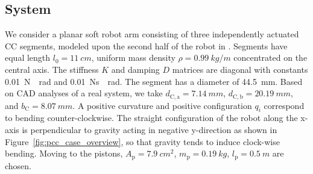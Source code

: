\subsection{System}
%
We consider a planar soft robot arm consisting of three independently actuated CC segments, modeled upon the second half of the robot in \cite{della2020model}. %
Segments have equal length $l_{0} = \SI{11}{cm}$, uniform mass density $\rho = \SI{0.99}{kg \per m}$ concentrated on the central axis. %
%
The stiffness $K$ and damping $D$ matrices are diagonal with constants \SI{0.01}{N \per rad} and \SI{0.01}{Ns \per rad}. The segment has a diameter of \SI{44.5}{mm}. Based on CAD analyses of a real system, we take $d_{\mathrm{C},\mathrm{a}} = \SI{7.14}{mm}$, $d_{\mathrm{C},\mathrm{b}} = \SI{20.19}{mm}$, and $b_\mathrm{C} = \SI{8.07}{mm}$.
%
A positive curvature and positive configuration $q_i$ correspond to bending counter-clockwise. 
The straight configuration of the robot along the x-axis is perpendicular to gravity acting in negative y-direction as shown in Figure~\ref{fig:pcc_case_overview}, so that gravity tends to induce clock-wise bending.
%
Moving to the pistons, $A_\mathrm{p} = \SI{7.9}{cm^2}$, $m_\mathrm{p} = \SI{0.19}{kg}$, $l_\mathrm{p} = \SI{0.5}{m}$ are chosen.
